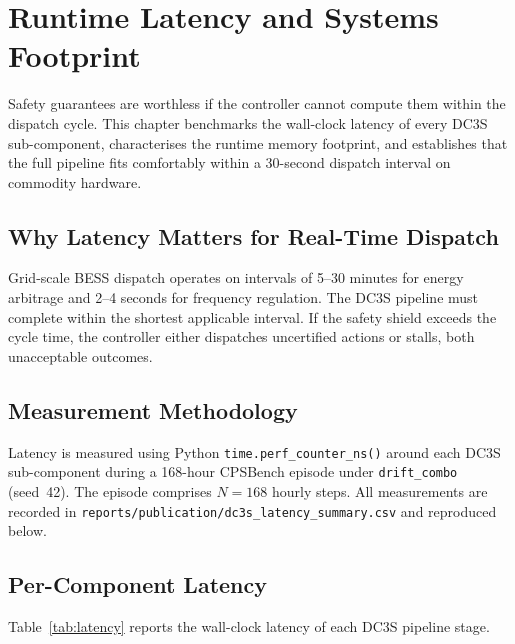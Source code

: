 
\section{Runtime Latency and Systems Footprint}
\label{ch:latency}

Safety guarantees are worthless if the controller cannot compute them
within the dispatch cycle.  This chapter benchmarks the wall-clock
latency of every DC3S sub-component, characterises the runtime memory
footprint, and establishes that the full pipeline fits comfortably
within a 30-second dispatch interval on commodity hardware.

\subsection{Why Latency Matters for Real-Time Dispatch}

Grid-scale BESS dispatch operates on intervals of 5--30 minutes for
energy arbitrage and 2--4 seconds for frequency regulation.  The DC3S
pipeline must complete within the shortest applicable interval.  If the
safety shield exceeds the cycle time, the controller either dispatches
uncertified actions or stalls, both unacceptable outcomes.

\subsection{Measurement Methodology}

Latency is measured using Python \texttt{time.perf\_counter\_ns()} around
each DC3S sub-component during a 168-hour CPSBench episode under
\texttt{drift\_combo} (seed~42).  The episode comprises $N=168$ hourly
steps.  All measurements are recorded in
\texttt{reports/publication/dc3s\_latency\_summary.csv} and reproduced
below.

\subsection{Per-Component Latency}

Table~\ref{tab:latency} reports the wall-clock latency of each DC3S
pipeline stage.

